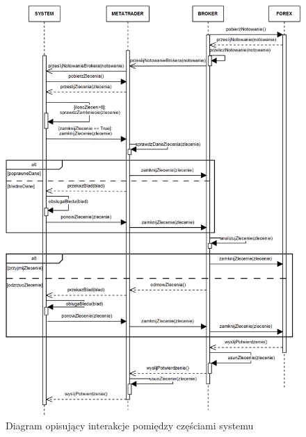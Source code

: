 \documentclass[pdflatex,11pt]{aghdpl}
\begin{document}
\begin{figure}[ht]
\begin{center}
\includegraphics[width=16cm]{sekwencji.png}
\caption{Diagram opisujący interakcje pomiędzy częściami systemu}
\label{sekwencji}
\end{center}
\end{figure} 

% 
% 



\end{document}
